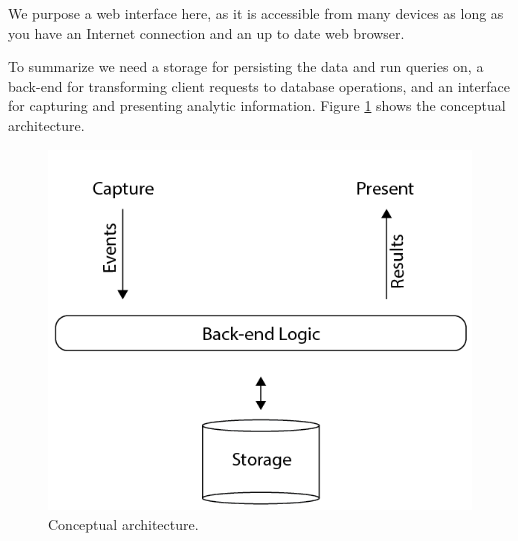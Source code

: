 We purpose a web interface here, as it is accessible from many devices as long as you have an Internet connection and an up to date web browser. 


To summarize we need a storage for persisting the data and run queries on, a back-end for transforming client requests to database operations, and an interface for capturing and presenting analytic information. Figure \ref{fig:conept_arch} shows the conceptual architecture. 

\begin{figure}[ht!]
\centering
\includegraphics[width=150mm]{images/architecture/conceptual_architecture.png}
\caption{Conceptual architecture.}
\label{fig:conept_arch}
\end{figure}



